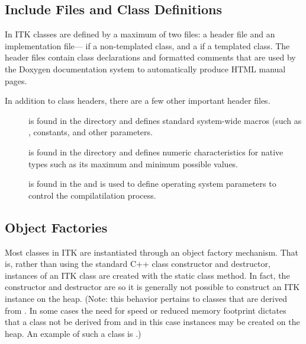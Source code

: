 \subsection{Include Files and Class Definitions}
\label{sec:IncludeFiles}

In ITK classes are defined by a maximum of two files: a header  file
and an implementation file--- if a non-templated class, and a
 if a templated class.
The header files contain class declarations
and formatted comments that are used by the Doxygen documentation
system to automatically produce HTML manual pages.

In addition to class headers, there are a few other important header files.
\begin{description}
        \item[] is found in the  directory
        and defines standard system-wide macros (such as ,
        constants, and other parameters.

        \item[] is found in the  
        directory and defines numeric characteristics for native types such
        as its maximum and minimum possible values.

        \item[] is found in the  
        and is used to define operating system parameters to control
        the compilatilation process.
\end{description}

\subsection{Object Factories}
\label{sec:ObjectFactories}

Most classes in ITK are instantiated through an object factory
mechanism. That is, rather than using the standard C++ class constructor and
destructor, instances of an ITK class are created with the static class
 method. In fact, the constructor and destructor are
 so it is generally not possible to construct an ITK
instance on the heap. (Note: this behavior pertains to classes that are
derived from . In some cases the need for speed or
reduced memory footprint dictates that a class not be derived from
 and in this case instances may be created on the heap. An
example of such a class is .)

